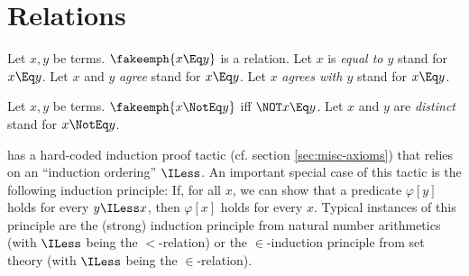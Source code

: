 \documentclass{stex}
\begin{document}


\section{Relations}\label{sec:relations}

\begin{sparagraph}[style=symdoc,for=Eq]
  \begin{signature*}
    Let $x, y$ be terms.
    $\fakeemph{x \Eq y}$ is a relation.
    Let $x$ is \emph{equal to $y$} stand for $x \Eq y$.
    Let $x$ and $y$ \emph{agree} stand for $x \Eq y$.
    Let $x$ \emph{agrees with $y$} stand for $x \Eq y$.
  \end{signature*}
\end{sparagraph}

\begin{sparagraph}[style=symdoc,for=NotEq]
  \begin{definition*}
    Let $x, y$ be terms.
    $\fakeemph{x \NotEq y}$ iff $\NOT x \Eq y$.
    Let $x$ and $y$ are \emph{distinct} stand for $x \NotEq y$.
  \end{definition*}
\end{sparagraph}

\Naproche has a hard-coded induction proof tactic (cf. section
\ref{sec:misc-axioms}) that relies on an ``induction ordering'' $\ILess$.
An important special case of this tactic is the following induction principle:
If, for all $x$, we can show that a predicate $\varphi[y]$ holds for every
$y \ILess x$, then $\varphi[x]$ holds for every $x$.
Typical instances of this principle are the (strong) induction principle from
natural number arithmetics (with $\ILess$ being the $<$-relation) or the
$\in$-induction principle from set theory (with $\ILess$ being the
$\in$-relation).
\end{document}
